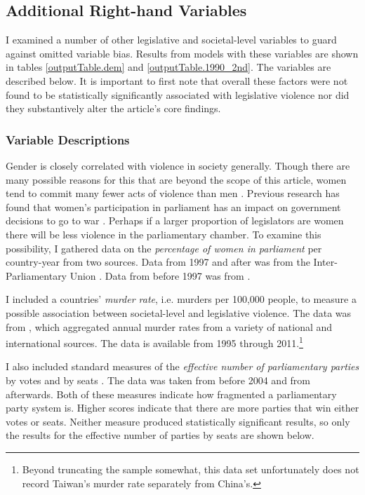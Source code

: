 \documentclass[a4paper]{article}\usepackage[]{graphicx}\usepackage[]{color}
\begin{document}
\subsection*{Additional Right-hand Variables}


I examined a number of other legislative and societal-level variables to guard against omitted variable bias. Results from models with these variables are shown in tables \ref{outputTable.dem} and \ref{outputTable.1990_2nd}. The variables are described below. It is important to first note that overall these factors were not found to be statistically significantly associated with legislative violence nor did they substantively alter the article's core findings.

\subsubsection*{Variable Descriptions}

Gender is closely correlated with violence in society generally. Though there are many possible reasons for this that are beyond the scope of this article, women tend to commit many fewer acts of violence than men \citep[]{Schwartz2009}. Previous research has found that women's participation in parliament has an impact on government decisions to go to war \citep{Melander2005}. Perhaps if a larger proportion of legislators are women there will be less violence in the parliamentary chamber. To examine this possibility, I gathered data on the \emph{percentage of women in parliament} per country-year from two sources. Data from 1997 and after was from the Inter-Parliamentary Union \citeyearpar{IPU2013}. Data from before 1997 was from \cite{Schwartz2009}.

I included a countries' \emph{murder rate}, i.e. murders per 100,000 people, to measure a possible association between societal-level and legislative violence. The data was from \cite{UNMurder2013}, which aggregated annual murder rates from a variety of national and international sources. The data is available from 1995 through 2011.\footnote{Beyond truncating the sample somewhat, this data set unfortunately does not record Taiwan's murder rate separately from China's.}

I also included standard measures of the \emph{effective number of parliamentary parties} by votes and by seats \citep[]{Laakso1979, Taagepera1989}. The data was taken from \cite{Carey2011} before 2004 and from \cite{Gallagher2012} afterwards. Both of these measures indicate how fragmented a parliamentary party system is. Higher scores indicate that there are more parties that win either votes or seats. Neither measure produced statistically significant results, so only the results for the effective number of parties by seats are shown below.
\end{document}
